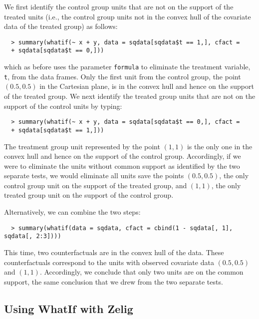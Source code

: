 \documentclass[oneside,letterpaper,titlepage]{article}
\begin{document}
We first identify the control group units that are not on the support
of the treated units (i.e., the control group units not in the convex
hull of the covariate data of the treated group) as follows:
  \begin{verbatim}
  > summary(whatif(~ x + y, data = sqdata[sqdata$t == 1,], cfact = 
  + sqdata[sqdata$t == 0,]))
  \end{verbatim}
which as before uses the parameter \texttt{formula} to eliminate the
treatment variable, \texttt{t}, from the data frames.  Only the first unit
from the control group, the point $(0.5, 0.5)$ in the Cartesian plane,
is in the convex hull and hence on the support of the treated group.
We next identify the treated group units that are not on the support
of the control units by typing:
  \begin{verbatim}
  > summary(whatif(~ x + y, data = sqdata[sqdata$t == 0,], cfact = 
  + sqdata[sqdata$t == 1,]))
  \end{verbatim}
The treatment group unit represented by the point $(1, 1)$ is the only
one in the convex hull and hence on the support of the control group.
Accordingly, if we were to eliminate the units without common support
as identified by the two separate tests, we would eliminate all units
save the points $(0.5, 0.5)$, the only control group unit on the support
of the treated group, and $(1, 1)$, the only treated group unit on the
support of the control group.

Alternatively, we can combine the two steps:
  \begin{verbatim}
  > summary(whatif(data = sqdata, cfact = cbind(1 - sqdata[, 1], sqdata[, 2:3])))
  \end{verbatim}
This time, two counterfactuals are in the convex hull of the data.
These counterfactuals correspond to the units with observed covariate
data $(0.5, 0.5)$ and $(1, 1)$.  Accordingly, we conclude that only two
units are on the common support, the same conclusion that we drew from
the two separate tests.

\subsection{Using WhatIf with Zelig}
\end{document}
